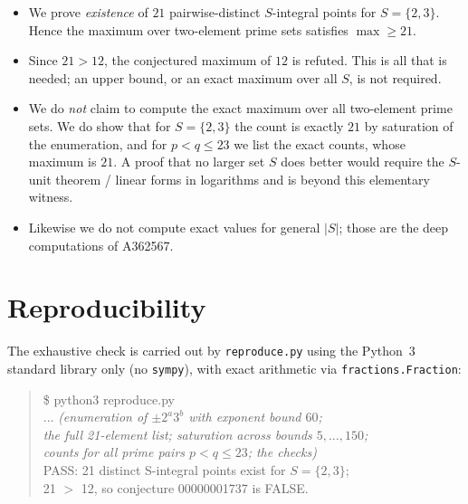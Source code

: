 \documentclass[11pt]{article}
\theoremstyle{definition}
\theoremstyle{remark}
\begin{document}
\begin{itemize}
\item We prove \emph{existence} of $21$ pairwise-distinct $S$-integral points
  for $S=\{2,3\}$. Hence the maximum over two-element prime sets satisfies
  $\max \ge 21$.
\item Since $21 > 12$, the conjectured maximum of $12$ is refuted. This is all
  that is needed; an upper bound, or an exact maximum over all $S$, is not
  required.
\item We do \emph{not} claim to compute the exact maximum over all two-element
  prime sets. We do show that for $S=\{2,3\}$ the count is exactly $21$ by
  saturation of the enumeration, and for $p<q\le 23$ we list the exact counts,
  whose maximum is $21$. A proof that no larger set $S$ does better would
  require the $S$-unit theorem / linear forms in logarithms and is beyond this
  elementary witness.
\item Likewise we do not compute exact values for general $|S|$; those are the
  deep computations of A362567.
\end{itemize}

\section{Reproducibility}\label{sec:formal}

The exhaustive check is carried out by \texttt{reproduce.py} using the Python~3
standard library only (no \texttt{sympy}), with exact arithmetic via
\texttt{fractions.Fraction}:

\begin{quote}\small\ttfamily
\$ python3 reproduce.py\\
... \textit{(enumeration of $\pm 2^{a}3^{b}$ with exponent bound $60$;}\\
\textit{the full 21-element list; saturation across bounds $5,\dots,150$;}\\
\textit{counts for all prime pairs $p<q\le 23$; the checks)}\\
PASS: 21 distinct S-integral points exist for $S = \{2,3\}$;\\
\hspace*{1.5em}21 $>$ 12, so conjecture 00000001737 is FALSE.
\end{quote}
\end{document}
